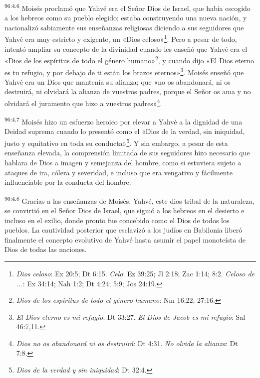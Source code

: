 \par
\textsuperscript{96:4.6} Moisés proclamó que Yahvé era el Señor Dios de Israel, que había escogido a los hebreos como su pueblo elegido; estaba construyendo una nueva nación, y nacionalizó sabiamente sus enseñanzas religiosas diciendo a sus seguidores que Yahvé era muy estricto y exigente, un «Dios celoso»\footnote{\textit{Dios celoso}: Ex 20:5; Dt 6:15. \textit{Celo}: Ez 39:25; Jl 2:18; Zac 1:14; 8:2. \textit{Celoso de ...}: Ex 34:14; Nah 1:2; Dt 4:24; 5:9; Jos 24:19.}. Pero a pesar de todo, intentó ampliar su concepto de la divinidad cuando les enseñó que Yahvé era el «Dios de los espíritus de todo el género humano»\footnote{\textit{Dios de los espíritus de todo el género humano}: Nm 16:22; 27:16.}, y cuando dijo «El Dios eterno es tu refugio, y por debajo de ti están los brazos eternos»\footnote{\textit{El Dios eterno es mi refugio}: Dt 33:27. \textit{El Dios de Jacob es mi refugio}: Sal 46:7,11.}. Moisés enseñó que Yahvé era un Dios que mantenía su alianza; que «no os abandonará, ni os destruirá, ni olvidará la alianza de vuestros padres, porque el Señor os ama y no olvidará el juramento que hizo a vuestros padres»\footnote{\textit{Dios no os abandonará ni os destruirá}: Dt 4:31. \textit{No olvida la alianza}: Dt 7:8.}.

\par
\textsuperscript{96:4.7} Moisés hizo un esfuerzo heroico por elevar a Yahvé a la dignidad de una Deidad suprema cuando lo presentó como el «Dios de la verdad, sin iniquidad, justo y equitativo en toda su conducta»\footnote{\textit{Dios de la verdad y sin iniquidad}: Dt 32:4.}. Y sin embargo, a pesar de esta enseñanza elevada, la comprensión limitada de sus seguidores hizo necesario que hablara de Dios a imagen y semejanza del hombre, como si estuviera sujeto a ataques de ira, cólera y severidad, e incluso que era vengativo y fácilmente influenciable por la conducta del hombre.

\par
\textsuperscript{96:4.8} Gracias a las enseñanzas de Moisés, Yahvé, este dios tribal de la naturaleza, se convirtió en el Señor Dios de Israel, que siguió a los hebreos en el desierto e incluso en el exilio, donde pronto fue concebido como el Dios de todos los pueblos. La cautividad posterior que esclavizó a los judíos en Babilonia liberó finalmente el concepto evolutivo de Yahvé hasta asumir el papel monoteísta de Dios de todas las naciones.

